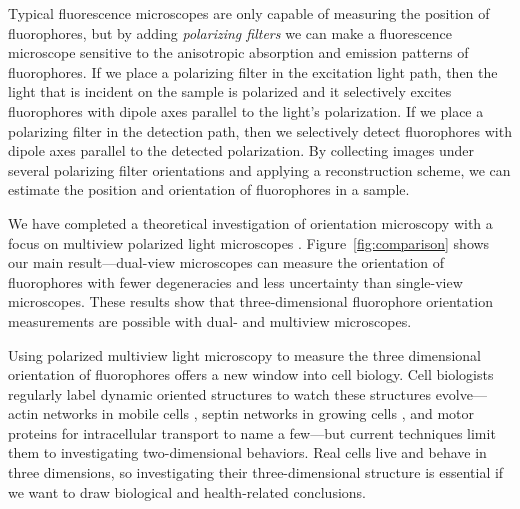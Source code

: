 \documentclass[11pt]{article}
\begin{document}
Typical fluorescence microscopes are only capable of measuring the position of
fluorophores, but by adding \textit{polarizing filters} we can make a
fluorescence microscope sensitive to the anisotropic absorption and emission
patterns of fluorophores. If we place a polarizing filter in the excitation
light path, then the light that is incident on the sample is polarized and it
selectively excites fluorophores with dipole axes parallel to the light's
polarization. If we place a polarizing filter in the detection path, then we
selectively detect fluorophores with dipole axes parallel to the detected
polarization. By collecting images under several polarizing filter orientations
and applying a reconstruction scheme, we can estimate the position and
orientation of fluorophores in a sample.

We have completed a theoretical investigation of orientation microscopy with a
focus on multiview polarized light microscopes
\cite{chandler17}. Figure~\ref{fig:comparison} shows our main result---dual-view
microscopes can measure the orientation of fluorophores with fewer degeneracies
and less uncertainty than single-view microscopes. These results show that
three-dimensional fluorophore orientation measurements are possible with dual-
and multiview microscopes.

Using polarized multiview light microscopy to measure the three dimensional
orientation of fluorophores offers a new window into cell biology. Cell
biologists regularly label dynamic oriented structures to watch these structures
evolve---actin networks in mobile cells \cite{mehta2016}, septin networks in
growing cells \cite{demay2011}, and motor proteins for intracellular transport
\cite{forkey2003} to name a few---but current techniques limit them to
investigating two-dimensional behaviors. Real cells live and behave in three
dimensions, so investigating their three-dimensional structure is essential if
we want to draw biological and health-related conclusions.
\end{document}
